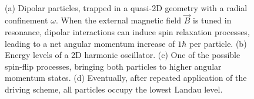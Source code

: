 \begin{figure}[b]
	\subfloat[]{
		\label{fig:fig1a}
	}
	\subfloat[]{
		\label{fig:fig1b}
   }\\
	\subfloat[]{
		\label{fig:fig1c}
	}
	\subfloat[]{
		\label{fig:fig1d}
	}

  \caption{\label{fig:fig1}(a) Dipolar particles, trapped in a quasi-2D geometry with a radial confinement $\omega$. When the external magnetic field $\vec{B}$ is tuned in resonance, dipolar interactions \Vdd can induce spin relaxation processes, leading to a net angular momentum increase of $1\hbar$ per particle. (b) Energy levels of a 2D harmonic oscillator. (c) One of the possible spin-flip processes, bringing both particles to higher angular momentum states. (d) Eventually, after repeated application of the driving scheme, all particles occupy the lowest Landau level.}
\end{figure}

